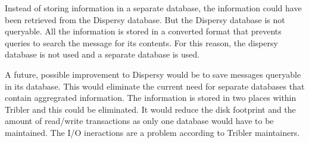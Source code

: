 Instead of storing information in a separate database,
the information could have been retrieved from the Dispersy database.
But the Dispersy database is not queryable.
All the information is stored in a converted format
that prevents queries to search the message for its contents.
For this reason, the dispersy database is not used and a separate database is used.

A future, possible improvement to Dispersy would be to save messages queryable in its database.
This would eliminate the current need for separate databases that contain aggregrated information.
The information is stored in two places within Tribler and this could be eliminated.
It would reduce the disk footprint and the amount of read/write transactions
as only one database would have to be maintained.
The I/O ineractions are a problem according to Tribler maintainers.
